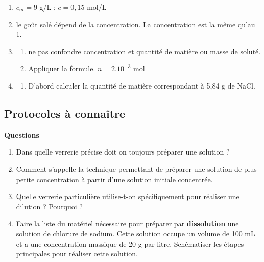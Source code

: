 \documentclass[
]{book}
\providecommand{\tightlist}{%
  \setlength{\itemsep}{0pt}\setlength{\parskip}{0pt}}
\def\tightlist{}
\begin{document}
\begin{enumerate}
\def\labelenumi{\arabic{enumi}.}
\item
  \(c_m=9\) g/L ; \(c=0,15\) mol/L
\item
  le goût salé dépend de la concentration. La concentration est la même qu'au 1.
\item
  \begin{enumerate}
  \def\labelenumii{\alph{enumii}.}
  \tightlist
  \item
    ne pas confondre concentration et quantité de matière ou masse de soluté.
  \item
    Appliquer la formule. \(n=2.10^{-3}\) mol
  \end{enumerate}
\item
  \begin{enumerate}
  \def\labelenumii{\alph{enumii}.}
  \tightlist
  \item
    D'abord calculer la quantité de matière correspondant à 5,84 g de NaCl.
  \end{enumerate}
\end{enumerate}

\hypertarget{protocoles-uxe0-connauxeetre}{%
\subsection{Protocoles à connaître}\label{protocoles-uxe0-connauxeetre}}

\begin{blackbox}

\begin{center}
\textbf{Questions}

\end{center}

\begin{enumerate}
\def\labelenumi{\arabic{enumi}.}
\tightlist
\item
  Dans quelle verrerie précise doit on toujours préparer une solution ?
\item
  Comment s'appelle la technique permettant de préparer une solution de plus petite concentration à partir d'une solution initiale concentrée.
\item
  Quelle verrerie particulière utilise-t-on spécifiquement pour réaliser une dilution ? Pourquoi ?
\item
  Faire la liste du matériel nécessaire pour préparer par \textbf{dissolution} une solution de chlorure de sodium. Cette solution occupe un volume de 100 mL et a une concentration massique de 20 g par litre. Schématiser les étapes principales pour réaliser cette solution.
\end{enumerate}

\end{blackbox}
\end{document}
